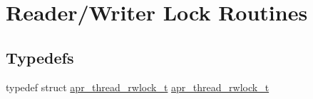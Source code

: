 \hypertarget{group__apr__thread__rwlock}{\section{Reader/\-Writer Lock Routines}
\label{group__apr__thread__rwlock}
}
\subsection*{Typedefs}
\begin{DoxyCompactItemize}
\item 
typedef struct \hyperlink{group__apr__thread__rwlock_gaede9b908e3d9e6a8aed7bd10d0ae0498}{apr\-\_\-thread\-\_\-rwlock\-\_\-t} \hyperlink{group__apr__thread__rwlock_gaede9b908e3d9e6a8aed7bd10d0ae0498}{apr\-\_\-thread\-\_\-rwlock\-\_\-t}
\end{DoxyCompactItemize}
